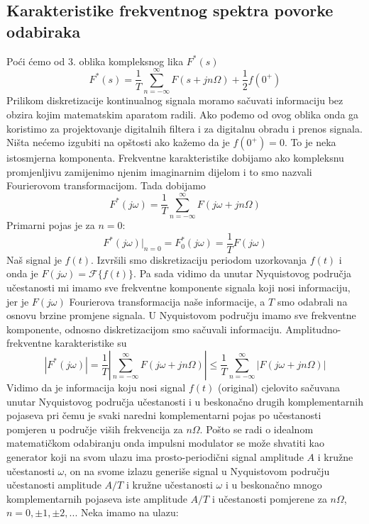 \documentclass{article}
\newcommand{\suma}{\sum\limits}
\begin{document}
	\subsection*{Karakteristike frekventnog spektra povorke odabiraka}
	Poći ćemo od 3. oblika kompleksnog lika $F^*(s)$
	$$F^*(s) = \frac{1}{T} \suma_{n=-\infty}^\infty F(s+jn\Omega) + \frac{1}{2} f(0^+)$$
	Prilikom diskretizacije kontinualnog signala moramo sačuvati informaciju bez obzira kojim matematskim aparatom radili. Ako pođemo od ovog oblika onda ga koristimo za projektovanje digitalnih filtera i za digitalnu obradu i prenos signala. Ništa nećemo izgubiti na opštosti ako kažemo da je $f(0^+) = 0$. To je neka istosmjerna komponenta. Frekventne karakteristike dobijamo ako kompleksnu promjenljivu zamijenimo njenim imaginarnim dijelom i to smo nazvali Fourierovom transformacijom. Tada dobijamo
	$$F^*(j\omega) = \frac{1}{T} \suma_{n=-\infty}^\infty F(j\omega+jn\Omega)$$
	Primarni pojas je za $n=0$:
	$$F^*(j\omega)\rvert_{n=0} = F_0^*(j\omega) = \frac{1}{T} F(j\omega)$$
	Naš signal je $f(t)$. Izvršili smo diskretizaciju periodom uzorkovanja $f(t)$ i onda je $F(j\omega) = \mathcal{F}\{f(t)\}$. Pa sada vidimo da unutar Nyquistovog područja učestanosti mi imamo sve frekventne komponente signala koji nosi informaciju, jer je $F(j\omega)$ Fourierova transformacija naše informacije, a $T$ smo odabrali na osnovu brzine promjene signala. U Nyquistovom području imamo sve frekventne komponente, odnosno diskretizacijom smo sačuvali informaciju. Amplitudno-frekventne karakteristike su
	$$|F^*(j\omega)| = \frac{1}{T} \left| \suma_{n=-\infty}^\infty F(j\omega+jn\Omega) \right| \le \frac{1}{T} \suma_{n=-\infty}^\infty |F(j\omega+jn\Omega)|$$
	Vidimo da je informacija koju nosi signal $f(t)$ (original) cjelovito sačuvana unutar Nyquistovog područja učestanosti i u beskonačno drugih komplementarnih pojaseva pri čemu je svaki naredni komplementarni pojas po učestanosti pomjeren u područje viših frekvencija za $n\Omega$. Pošto se radi o idealnom matematičkom odabiranju onda impulsni modulator se može shvatiti kao generator koji na svom ulazu ima prosto-periodični signal amplitude $A$ i kružne učestanosti $\omega$, on na svome izlazu generiše signal u Nyquistovom području učestanosti amplitude $A/T$ i kružne učestanosti $\omega$ i u beskonačno mnogo komplementarnih pojaseva iste amplitude $A/T$ i učestanosti pomjerene za $n\Omega$, $n=0,\pm1,\pm2,...$
	Neka imamo na ulazu:
\end{document}
